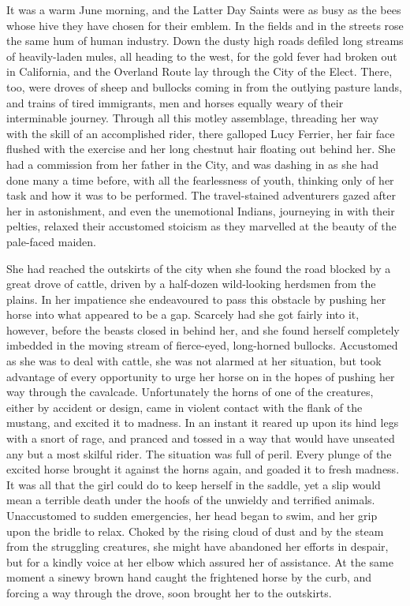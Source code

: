 It was a warm June morning, and the Latter Day Saints were as busy as the bees whose hive they have chosen for their emblem. In the fields and in the streets rose the same hum of human industry. Down the dusty high roads defiled long streams of heavily-laden mules, all heading to the west, for the gold fever had broken out in California, and the Overland Route lay through the City of the Elect. There, too, were droves of sheep and bullocks coming in from the outlying pasture lands, and trains of tired immigrants, men and horses equally weary of their interminable journey. Through all this motley assemblage, threading her way with the skill of an accomplished rider, there galloped Lucy Ferrier, her fair face flushed with the exercise and her long chestnut hair floating out behind her. She had a commission from her father in the City, and was dashing in as she had done many a time before, with all the fearlessness of youth, thinking only of her task and how it was to be performed. The travel-stained adventurers gazed after her in astonishment, and even the unemotional Indians, journeying in with their pelties, relaxed their accustomed stoicism as they marvelled at the beauty of the pale-faced maiden.

She had reached the outskirts of the city when she found the road blocked by a great drove of cattle, driven by a half-dozen wild-looking herdsmen from the plains. In her impatience she endeavoured to pass this obstacle by pushing her horse into what appeared to be a gap. Scarcely had she got fairly into it, however, before the beasts closed in behind her, and she found herself completely imbedded in the moving stream of fierce-eyed, long-horned bullocks. Accustomed as she was to deal with cattle, she was not alarmed at her situation, but took advantage of every opportunity to urge her horse on in the hopes of pushing her way through the cavalcade. Unfortunately the horns of one of the creatures, either by accident or design, came in violent contact with the flank of the mustang, and excited it to madness. In an instant it reared up upon its hind legs with a snort of rage, and pranced and tossed in a way that would have unseated any but a most skilful rider. The situation was full of peril. Every plunge of the excited horse brought it against the horns again, and goaded it to fresh madness. It was all that the girl could do to keep herself in the saddle, yet a slip would mean a terrible death under the hoofs of the unwieldy and terrified animals. Unaccustomed to sudden emergencies, her head began to swim, and her grip upon the bridle to relax. Choked by the rising cloud of dust and by the steam from the struggling creatures, she might have abandoned her efforts in despair, but for a kindly voice at her elbow which assured her of assistance. At the same moment a sinewy brown hand caught the frightened horse by the curb, and forcing a way through the drove, soon brought her to the outskirts.

